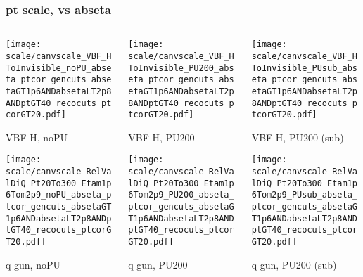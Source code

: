 \documentclass[8pt]{beamer}
\begin{document}
  \begin{frame}
  \frametitle{pt scale, vs abseta}
  
  \begin{columns}
   \begin{column}{0.35\textwidth}
     \texttt{[image: scale/canvscale\_VBF\_HToInvisible\_noPU\_abseta\_ptcor\_gencuts\_absetaGT1p6ANDabsetaLT2p8ANDptGT40\_recocuts\_ptcorGT20.pdf]}
     
     VBF H, noPU
    
     \texttt{[image: scale/canvscale\_RelValDiQ\_Pt20To300\_Etam1p6Tom2p9\_noPU\_abseta\_ptcor\_gencuts\_absetaGT1p6ANDabsetaLT2p8ANDptGT40\_recocuts\_ptcorGT20.pdf]}
     
     q gun, noPU
   \end{column}
   \begin{column}{0.35\textwidth}
     \texttt{[image: scale/canvscale\_VBF\_HToInvisible\_PU200\_abseta\_ptcor\_gencuts\_absetaGT1p6ANDabsetaLT2p8ANDptGT40\_recocuts\_ptcorGT20.pdf]}
     
     VBF H, PU200
    
     \texttt{[image: scale/canvscale\_RelValDiQ\_Pt20To300\_Etam1p6Tom2p9\_PU200\_abseta\_ptcor\_gencuts\_absetaGT1p6ANDabsetaLT2p8ANDptGT40\_recocuts\_ptcorGT20.pdf]}
     
     q gun, PU200
   \end{column}
   \begin{column}{0.35\textwidth}
     \texttt{[image: scale/canvscale\_VBF\_HToInvisible\_PUsub\_abseta\_ptcor\_gencuts\_absetaGT1p6ANDabsetaLT2p8ANDptGT40\_recocuts\_ptcorGT20.pdf]}
     
     VBF H, PU200 (sub)
    
     \texttt{[image: scale/canvscale\_RelValDiQ\_Pt20To300\_Etam1p6Tom2p9\_PUsub\_abseta\_ptcor\_gencuts\_absetaGT1p6ANDabsetaLT2p8ANDptGT40\_recocuts\_ptcorGT20.pdf]}
     
     q gun, PU200 (sub)
   \end{column}
  \end{columns}
 \end{frame}
 
\end{document}
